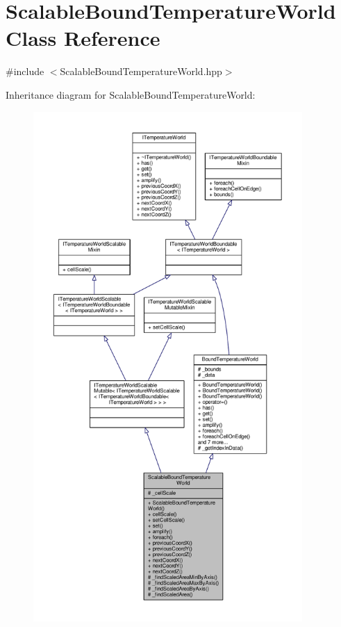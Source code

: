 \hypertarget{class_scalable_bound_temperature_world}{\section{Scalable\-Bound\-Temperature\-World Class Reference}
\label{class_scalable_bound_temperature_world}
}


{\ttfamily \#include $<$Scalable\-Bound\-Temperature\-World.\-hpp$>$}



Inheritance diagram for Scalable\-Bound\-Temperature\-World\-:
\nopagebreak
\begin{figure}[H]
\begin{center}
\leavevmode
\includegraphics[height=550pt]{class_scalable_bound_temperature_world__inherit__graph}
\end{center}
\end{figure}


